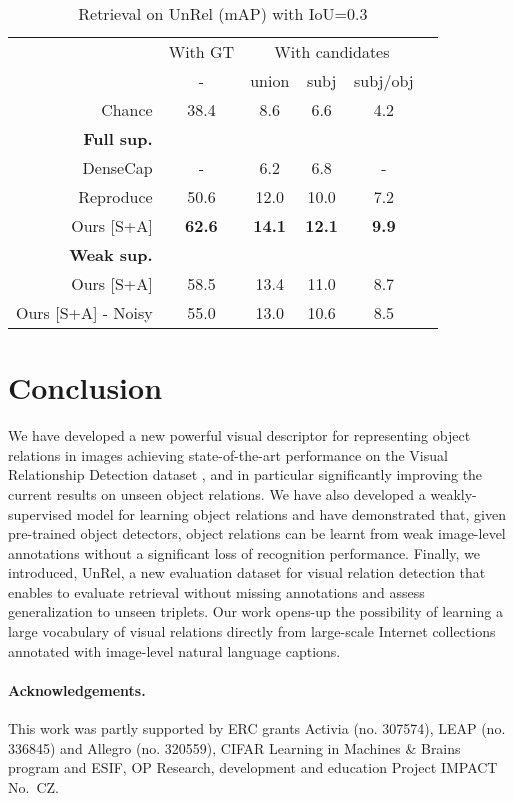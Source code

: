 \documentclass[10pt,twocolumn,letterpaper]{article}
\newcommand{\ra}[1]{\renewcommand{\arraystretch}{#1}}
\begin{document}
\begin{table}\centering
\small{
\ra{1}
\begin{tabular}{@{}rccccc@{}}\toprule
& \multicolumn{1}{c}{With GT} & \multicolumn{3}{c}{With candidates} \\
& - & union & subj & subj/obj
\\\midrule
\rule{0pt}{2ex}  
Chance 					& 38.4	& 8.6 	& 6.6 	& 4.2 \\
\rule{0pt}{2ex}  
\textbf{Full sup.}\\
\rule{0pt}{1ex} 
DenseCap \cite{Johnson2015} 		& - 		& 6.2 	& 6.8 	& - \\
Reproduce \cite{Lu16} 			& 50.6 	& 12.0 	& 10.0 	& 7.2  \\
Ours [S+A] 				&  \textbf{62.6} & \textbf{14.1} & \textbf{12.1} & \textbf{9.9} \\
\rule{0pt}{3ex}  
\textbf{Weak sup.}\\
\rule{0pt}{1ex} 
Ours [S+A] 					&  58.5 		& 13.4 	& 11.0 	& 8.7 \\
Ours [S+A] - Noisy			&  55.0 		& 13.0 	& 10.6	& 8.5 \\
\bottomrule
\end{tabular}
\setlength\abovecaptionskip{5pt}
\caption{Retrieval on UnRel (mAP) with IoU=0.3} 
\label{tab:results_rarerel}
}
\end{table}

\section{Conclusion}
We have developed a new powerful visual descriptor for representing object relations in images achieving state-of-the-art performance on the Visual Relationship Detection dataset \cite{Lu16}, and in particular significantly improving the current results on unseen object relations. We have also developed a weakly-supervised model for learning object relations and have demonstrated that, given pre-trained object detectors, object relations can be learnt from weak image-level annotations without a significant loss of recognition performance. Finally, we introduced, UnRel, a new evaluation dataset for visual relation detection that enables to evaluate retrieval without missing annotations and assess generalization to unseen triplets. Our work opens-up the possibility of learning a large vocabulary of visual relations directly from large-scale Internet collections annotated with image-level natural language captions.    

\paragraph{Acknowledgements.}
\small{This work was partly supported by ERC grants Activia (no. 307574),
LEAP (no. 336845) and Allegro (no. 320559), CIFAR Learning in Machines \& Brains program and ESIF, OP Research, development and education Project IMPACT
No.\ CZ.}
\end{document}
